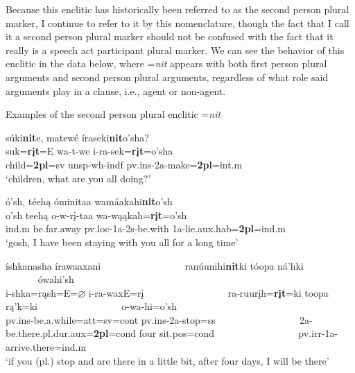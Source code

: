 Because this enclitic has historically been referred to as the second person plural marker, I continue to refer to it by this nomenclature, though the fact that I call it a second person plural marker should not be confused with the fact that it really is a speech act participant plural marker. We can see the behavior of this enclitic in the data below, where =\textit{nit} appears with both first person plural arguments and second person plural arguments, regardless of what role said arguments play in a clause, i.e., agent or non-agent.

\begin{exe}

\item\label{2ndpersonplural} Examples of the second person plural enclitic =\textit{nit}

	\begin{xlist}
	
	\item\label{2ndpersonplural1} 
	\glll súki\textbf{nit}e, matewé íraseki\textbf{nit}o'sha?\\
	suk=\textbf{rįt}=E wa-t-we i-ra-sek=\textbf{rįt}=o'sha\\
	\textnormal{child}=\textbf{2pl}=sv unsp-wh-indf pv.ins-2a-\textnormal{make}=\textbf{2pl}=int.m\\
	\glt `children, what are you all doing?' \citep[28]{hollow1973a}

	\item\label{2ndpersonplural2} 
	\glll ó'sh, téehą óminitaa wamáakahi\textbf{nit}o'sh\\
	o'sh teehą o-w-rį-taa wa-wąąkah=\textbf{rįt}=o'sh\\
	\textnormal{ind.m} \textnormal{be.far.away} pv.loc-1a-2s-\textnormal{be.with} 1a-\textnormal{lie}.aux.hab=\textbf{2pl}=ind.m\\
	\glt `gosh, I have been staying with you all for a long time' \citep[31]{hollow1973a}

	\item\label{2ndpersonplural3} 
	\glll íshkanasha írawaaxani ~ ~ ~ ~ ~ ~ ~ ~ ~ ~ ranúunihi\textbf{nit}ki tóopa ná'hki ~ ~ ~ ~ ~ ~ ~ ~ ~ ~ ówahi'sh\\
	i-shka=rąsh=E=$\varnothing$ i-ra-waxE=rį ~ ~ ~ ~ ~ ~ ~ ~ ~ ~ ra-ruurįh=\textbf{rįt}=ki toopa rą'k=ki ~ ~ ~ ~ ~ ~ ~ ~ ~ ~  o-wa-hi=o'sh\\
	pv.ins-\textnormal{be.a.while}=att=sv=cont pv.ins-2a-\textnormal{stop}=ss ~ ~ ~ ~ ~ ~ ~ ~ ~ ~ 2a-\textnormal{be.there}.pl.dur.aux=\textbf{2pl}=cond \textnormal{four} sit.pos=cond ~ ~ ~ ~ ~ ~ ~ ~ ~ ~ pv.irr-1a-\textnormal{arrive.there}=ind.m\\
	\glt `if you (pl.) stop and are there in a little bit, after four days, I will be there' \citep[130]{hollow1973a}


\end{xlist}
\end{exe}
